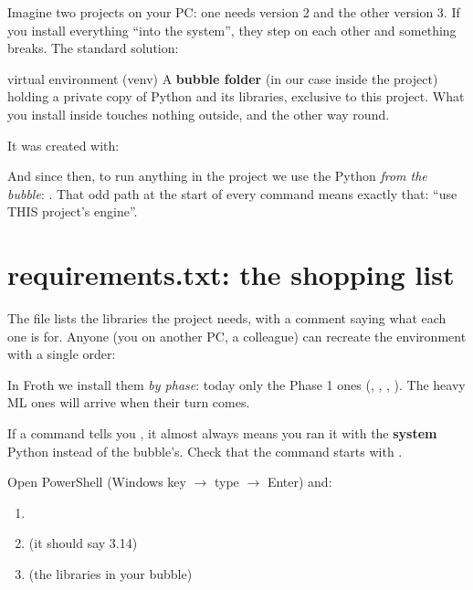 \documentclass[11pt,a4paper]{article}
\begin{document}
Imagine two projects on your PC: one needs  version 2 and the other version
3. If you install everything ``into the system'', they step on each other and something
breaks. The standard solution:

\begin{concepto}{virtual environment (venv)}
A \textbf{bubble folder} (in our case  inside the project) holding a private
copy of Python and its libraries, exclusive to this project. What you install inside touches
nothing outside, and the other way round.

It was created with: 

And since then, to run anything in the project we use the Python \emph{from the bubble}:
. That odd path at the start of
every command means exactly that: ``use THIS project's engine''.
\end{concepto}

\section{requirements.txt: the shopping list}

The  file lists the libraries the project needs, with a comment
saying what each one is for. Anyone (you on another PC, a colleague) can recreate the
environment with a single order:
\begin{center}
\end{center}
In Froth we install them \emph{by phase}: today only the Phase 1 ones (,
, , ). The heavy ML ones will arrive when
their turn comes.

\begin{ojo}
If a command tells you , it almost
always means you ran it with the \textbf{system} Python instead of the bubble's. Check that
the command starts with .
\end{ojo}

\begin{practica}
Open PowerShell (Windows key $\rightarrow$ type  $\rightarrow$ Enter) and:
\begin{enumerate}
  \item {}
  \item {} \quad (it should say 3.14)
  \item {} \quad (the libraries in your bubble)
\end{enumerate}
\end{practica}
\end{document}
